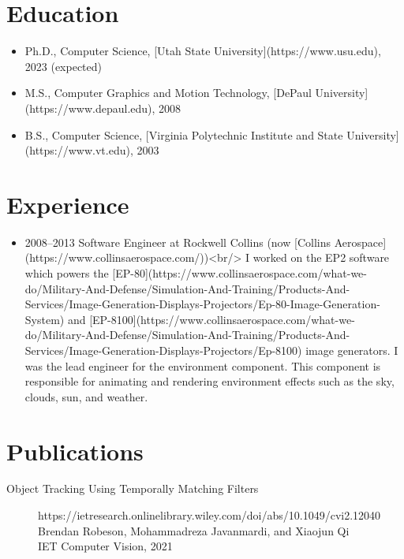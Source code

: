 \documentclass{moderncv}
\begin{document}
\section{Education}

\begin{itemize}
  \item Ph.D., Computer Science, [Utah State University](https://www.usu.edu), 2023 (expected)
  \item M.S., Computer Graphics and Motion Technology, [DePaul University](https://www.depaul.edu), 2008
  \item B.S., Computer Science, [Virginia Polytechnic Institute and State University](https://www.vt.edu), 2003
\end{itemize}

\section{Experience}

\begin{itemize}
  --Present Software Engineer at [Space Dynamics Laboratory](https://www.sdl.usu.edu/)<br/>
  I work on ground station software, primarily with image processing.
  I led development of multiple systems to display satellite imagery and associated meta-data.
  \item 2008--2013 Software Engineer at Rockwell Collins (now [Collins Aerospace](https://www.collinsaerospace.com/))<br/>
  I worked on the EP2 software which powers the [EP-80](https://www.collinsaerospace.com/what-we-do/Military-And-Defense/Simulation-And-Training/Products-And-Services/Image-Generation-Displays-Projectors/Ep-80-Image-Generation-System) and [EP-8100](https://www.collinsaerospace.com/what-we-do/Military-And-Defense/Simulation-And-Training/Products-And-Services/Image-Generation-Displays-Projectors/Ep-8100) image generators.
  I was the lead engineer for the environment component.
  This component is responsible for animating and rendering environment effects such as the sky, clouds, sun, and weather.
\end{itemize}

\section{Publications}

\begin{description}
  \item [Object Tracking Using Temporally Matching Filters] https://ietresearch.onlinelibrary.wiley.com/doi/abs/10.1049/cvi2.12040\\
  Brendan Robeson, Mohammadreza Javanmardi, and Xiaojun Qi\\
  IET Computer Vision, 2021
\end{description}
\end{document}
